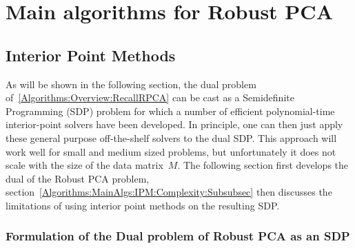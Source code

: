 \section{Main algorithms for Robust PCA}
\label{Algorithms:MainAlgs:Sec}


\subsection{Interior Point Methods}
\label{Algorithms:MainAlgs:IPM:Subsec}

As will be shown in the following section, the dual problem of~\eqref{Algorithms:Overview:RecallRPCA} can be cast as a Semidefinite Programming (SDP) problem for which a number of efficient polynomial-time interior-point solvers have been developed. In principle, one can then just apply these general purpose off-the-shelf solvers to the dual SDP. This approach will work well for small and medium sized problems, but unfortunately it does not scale with the size of the data matrix~$M$. The following section first develops the dual of the Robust PCA problem, section~\ref{Algorithms:MainAlgs:IPM:Complexity:Subsubsec} then discusses the limitations of using interior point methods on the resulting SDP. 


\subsubsection{Formulation of the Dual problem of Robust PCA as an SDP}
\label{Algorithms:MainAlgs:IPM:SDPform:Subsubsec}

